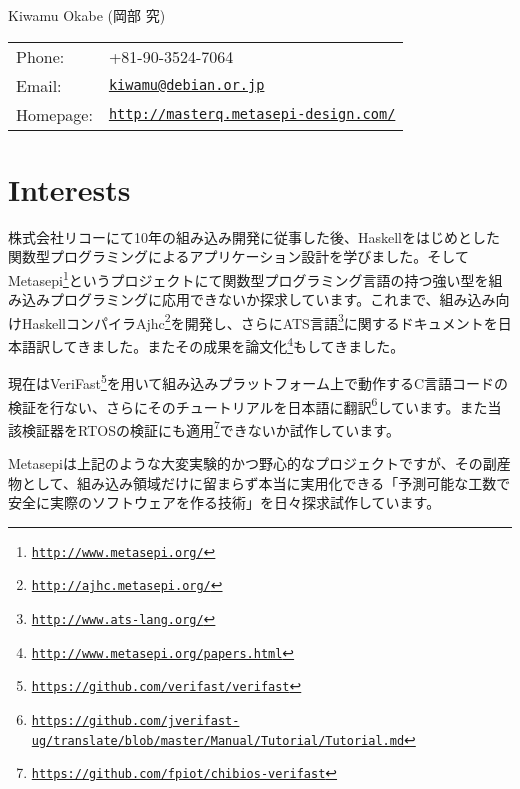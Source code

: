 \documentclass[letterpaper]{article}
\def\name{Kiwamu Okabe (岡部 究)}
\begin{document}
{\huge \name}


\vspace{0.25in}

\begin{minipage}{0.3\linewidth}
  \begin{tabular}{ll}
    Phone: & +81-90-3524-7064 \\
    Email: & \href{mailto:kiwamu@debian.or.jp}{\tt kiwamu@debian.or.jp} \\
    Homepage: & \href{http://masterq.metasepi-design.com/}{\tt http://masterq.metasepi-design.com/} \\
  \end{tabular}
\end{minipage}

\section*{Interests}

株式会社リコーにて10年の組み込み開発に従事した後、Haskellをはじめとした関数型プログラミングによるアプリケーション設計を学びました。そしてMetasepi\footnote{\href{http://www.metasepi.org/}{\tt http://www.metasepi.org/}}というプロジェクトにて関数型プログラミング言語の持つ強い型を組み込みプログラミングに応用できないか探求しています。これまで、組み込み向けHaskellコンパイラAjhc\footnote{\href{http://ajhc.metasepi.org/}{\tt http://ajhc.metasepi.org/}}を開発し、さらにATS言語\footnote{\href{http://www.ats-lang.org/}{\tt http://www.ats-lang.org/}}に関するドキュメントを日本語訳してきました。またその成果を論文化\footnote{\href{http://www.metasepi.org/papers.html}{\tt http://www.metasepi.org/papers.html}}もしてきました。

現在はVeriFast\footnote{\href{https://github.com/verifast/verifast}{\tt https://github.com/verifast/verifast}}を用いて組み込みプラットフォーム上で動作するC言語コードの検証を行ない、さらにそのチュートリアルを日本語に翻訳\footnote{\href{https://github.com/jverifast-ug/translate/blob/master/Manual/Tutorial/Tutorial.md}{\tt https://github.com/jverifast-ug/translate/blob/master/Manual/Tutorial/Tutorial.md}}しています。また当該検証器をRTOSの検証にも適用\footnote{\href{https://github.com/fpiot/chibios-verifast}{\tt https://github.com/fpiot/chibios-verifast}}できないか試作しています。

Metasepiは上記のような大変実験的かつ野心的なプロジェクトですが、その副産物として、組み込み領域だけに留まらず本当に実用化できる「予測可能な工数で安全に実際のソフトウェアを作る技術」を日々探求試作しています。
\end{document}

